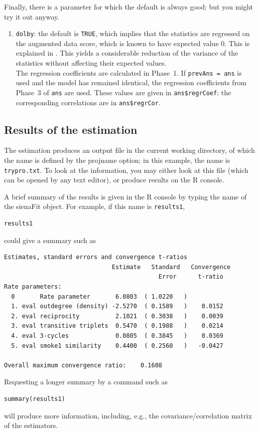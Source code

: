 \documentclass[a4paper,fleqn,11pt]{article}
\newcommand{\+}{\, + \,}
\newcommand{\sfn}[1]{\textsf{#1}}
\newcommand{\R}{{\sf R }}
\begin{document}
Finally, there is a parameter for which the default is always good;
but you might try it out anyway.
\begin{enumerate}[resume]
  \item \texttt{dolby}: the default is \texttt{TRUE}, which implies that the
   statistics are regressed on the augmented data score, which is known to have
   expected value 0. This is explained in \citet{Snijders2013Greenwich}.
   This yields a considerable reduction of the variance of the statistics
   without affecting their expected values.\\
   The regression coefficients are calculated in Phase~1.
   If \texttt{prevAns = ans} is used
   and the model has remained identical, the regression coefficients from
   Phase~3 of \texttt{ans} are used.
   These values are given in \texttt{ans\$regrCoef};
   the corresponding correlations are in \texttt{ans\$regrCor}.

\end{enumerate}

\subsection{Results of the estimation}

The estimation produces an output file in the current working directory,
of which the name is defined by the \textsf{projname} option;
in this example, the name is \texttt{trypro.txt}.
To look at the information, you may either look at this file
(which can be opened by any text editor), or produce results on the \R console.

A brief summary of the results is given in the \R console by
typing the name of the  \sfn{sienaFit} object. For example,
if this name is \texttt{results1},
\begin{verbatim}
results1
\end{verbatim}
could give a summary such as
\par
{\footnotesize
\begin{verbatim}
Estimates, standard errors and convergence t-ratios
                              Estimate   Standard   Convergence
                                           Error      t-ratio
Rate parameters:
  0       Rate parameter       6.0803  ( 1.0220   )
  1. eval outdegree (density) -2.5270  ( 0.1589   )    0.0152
  2. eval reciprocity          2.1021  ( 0.3038   )    0.0039
  3. eval transitive triplets  0.5470  ( 0.1988   )    0.0214
  4. eval 3-cycles             0.0805  ( 0.3845   )    0.0369
  5. eval smoke1 similarity    0.4400  ( 0.2560   )   -0.0427

Overall maximum convergence ratio:    0.1608
\end{verbatim}
}
Requesting a longer summary by a command such as
\begin{verbatim}
summary(results1)
\end{verbatim}
will produce more information, including, e.g.,
the covariance/correlation matrix of the estimators.
\bigskip
\end{document}

